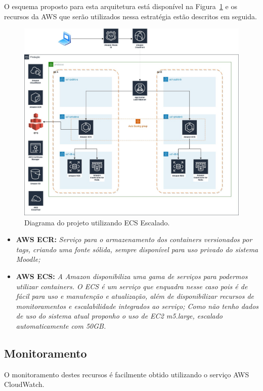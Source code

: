 \documentclass{article}
\begin{document}
O esquema proposto para esta arquitetura está disponível na Figura~\ref{fig:container} e os recursos da AWS que serão utilizados nessa estratégia estão descritos em seguida.

\begin{figure}[h!]
\centering
\includegraphics[scale=0.30]{ecs}
\caption{Diagrama do projeto utilizando ECS Escalado.}
\label{fig:container}
\end{figure}

\begin{itemize}
    \item \textbf{AWS ECR:} \textit{Serviço para o armazenamento dos containers versionados por tags, criando uma fonte sólida, sempre disponível para uso privado do sistema Moodle;}

    \item \textbf{AWS ECS:} \textit{A Amazon disponibiliza uma gama de serviços para podermos utilizar containers. O ECS é um serviço que enquadra nesse caso pois é de fácil para uso e manutenção e atualização, além de disponibilizar recursos de monitoramentos e escalabilidade integrados ao serviço; Como não tenho dados de uso do sistema atual proponho o uso de EC2 \textit{m5.large}, escalado automaticamente com 50GB.}
\end{itemize}


\subsection{Monitoramento}
O monitoramento destes recursos é facilmente obtido utilizando o serviço AWS CloudWatch.
\end{document}
